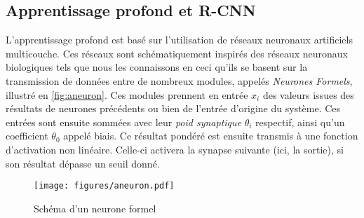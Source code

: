 		\subsection{Apprentissage profond et R-CNN}

			L'apprentissage profond est basé sur l'utilisation de réseaux neuronaux artificiels multicouche. Ces réseaux sont schématiquement inspirés des réseaux neuronaux biologiques tels que nous les connaissons en ceci qu'ils se basent sur la transmission de données entre de nombreux modules, appelés \emph{Neurones Formels}, illustré en \autoref{fig:aneuron}. Ces modules prennent en entrée $x_{i}$ des valeurs issues des résultats de neurones précédents ou bien de l'entrée d'origine du système. Ces entrées sont ensuite sommées avec leur \emph{poid synaptique} $\theta_{i}$ respectif, ainsi qu’un coefficient $\theta_{0}$ appelé biais. Ce résultat pondéré est ensuite transmis à une fonction d’activation non linéaire. Celle-ci activera la synapse suivante (ici, la sortie), si son résultat dépasse un seuil donné.
			\begin{figure}[h]
			{
				\centering
				\texttt{[image: figures/aneuron.pdf]}
				\caption{Schéma d'un neurone formel}
				\label{fig:aneuron}
			}
			\end{figure}
			
			

